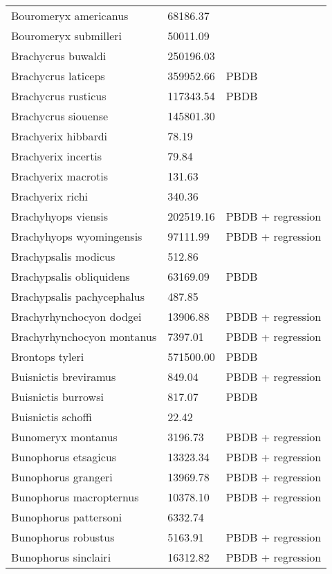 \begin{center}
\begin{longtable}{p{} p{} p{} }
  Bouromeryx americanus & 68186.37 & \cite{Tomiya2013} \\ 
  Bouromeryx submilleri & 50011.09 & \cite{Tomiya2013} \\ 
  Brachycrus buwaldi & 250196.03 & \cite{Tomiya2013} \\ 
  Brachycrus laticeps & 359952.66 & PBDB \\ 
  Brachycrus rusticus & 117343.54 & PBDB \\ 
  Brachycrus siouense & 145801.30 & \cite{Tomiya2013} \\ 
  Brachyerix hibbardi & 78.19 & \cite{Clemens2011} \\ 
  Brachyerix incertis & 79.84 & \cite{Tomiya2013} \\ 
  Brachyerix macrotis & 131.63 & \cite{Tomiya2013} \\ 
  Brachyerix richi & 340.36 & \cite{Tomiya2013} \\ 
  Brachyhyops viensis & 202519.16 & PBDB + regression \\ 
  Brachyhyops wyomingensis & 97111.99 & PBDB + regression \\ 
  Brachypsalis modicus & 512.86 & \cite{Tomiya2013} \\ 
  Brachypsalis obliquidens & 63169.09 & PBDB \\ 
  Brachypsalis pachycephalus & 487.85 & \cite{Tomiya2013} \\ 
  Brachyrhynchocyon dodgei & 13906.88 & PBDB + regression \\ 
  Brachyrhynchocyon montanus & 7397.01 & PBDB + regression \\ 
  Brontops tyleri & 571500.00 & PBDB \\ 
  Buisnictis breviramus & 849.04 & PBDB + regression \\ 
  Buisnictis burrowsi & 817.07 & PBDB \\ 
  Buisnictis schoffi & 22.42 & \cite{Tomiya2013} \\ 
  Bunomeryx montanus & 3196.73 & PBDB + regression \\ 
  Bunophorus etsagicus & 13323.34 & PBDB + regression \\ 
  Bunophorus grangeri & 13969.78 & PBDB + regression \\ 
  Bunophorus macropternus & 10378.10 & PBDB + regression \\ 
  Bunophorus pattersoni & 6332.74 & \cite{Macdonald1956} \\ 
  Bunophorus robustus & 5163.91 & PBDB + regression \\ 
  Bunophorus sinclairi & 16312.82 & PBDB + regression \\ 

\end{longtable}
\end{center}
